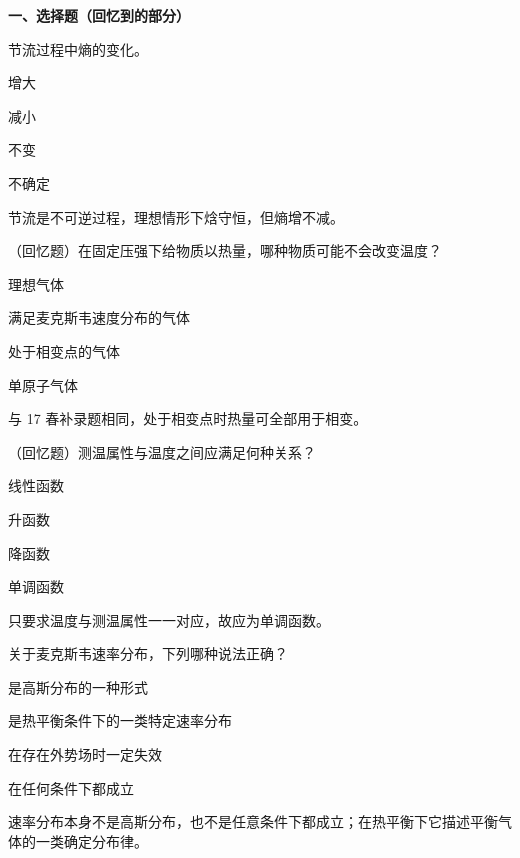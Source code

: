 ﻿


\textbf{一、选择题（回忆到的部分）}
\begin{question}
节流过程中熵的变化。
\begin{choiceoptions}
\item 增大
\item 减小
\item 不变
\item 不确定
\end{choiceoptions}
\begin{solution}
节流是不可逆过程，理想情形下焓守恒，但熵增不减。
\end{solution}
\end{question}

\begin{question}
（回忆题）在固定压强下给物质以热量，哪种物质可能不会改变温度？
\begin{choiceoptions}
\item 理想气体
\item 满足麦克斯韦速度分布的气体
\item 处于相变点的气体
\item 单原子气体
\end{choiceoptions}
\begin{solution}
与 17 春补录题相同，处于相变点时热量可全部用于相变。
\end{solution}
\end{question}

\begin{question}
（回忆题）测温属性与温度之间应满足何种关系？
\begin{choiceoptions}
\item 线性函数
\item 升函数
\item 降函数
\item 单调函数
\end{choiceoptions}
\begin{solution}
只要求温度与测温属性一一对应，故应为单调函数。
\end{solution}
\end{question}

\begin{question}
关于麦克斯韦速率分布，下列哪种说法正确？
\begin{choiceoptions}
\item 是高斯分布的一种形式
\item 是热平衡条件下的一类特定速率分布
\item 在存在外势场时一定失效
\item 在任何条件下都成立
\end{choiceoptions}
\begin{solution}
速率分布本身不是高斯分布，也不是任意条件下都成立；在热平衡下它描述平衡气体的一类确定分布律。
\end{solution}
\end{question}

